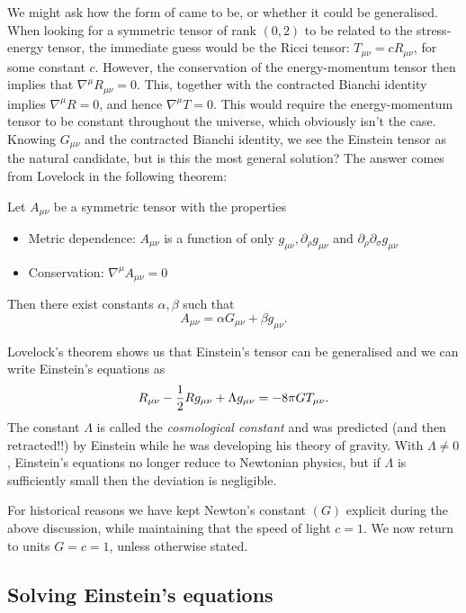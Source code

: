We might ask how the form of  came to be, or whether it could be generalised. When looking for a symmetric tensor of rank $(0,2)$ to be related to the stress-energy tensor, the immediate guess would be the Ricci tensor: $T_{\mu \nu} = c R_{\mu \nu}$, for some constant $c$. However, the conservation of the energy-momentum tensor then implies that $\nabla^\mu R_{\mu \nu} = 0$. This, together with the contracted Bianchi identity implies $\nabla^\mu R = 0$, and hence $\nabla^\mu T = 0$. This would require the energy-momentum tensor to be constant throughout the universe, which obviously isn't the case. Knowing $G_{\mu \nu}$ and the contracted Bianchi identity, we see the Einstein tensor as the natural candidate, but is this the most general solution? The answer comes from Lovelock \cite{Lovelock:1972vz} in the following theorem:
\begin{thm}[Lovelock]
	Let $A_{\mu \nu}$ be a symmetric tensor with the properties
	\begin{itemize}
		\item Metric dependence: $A_{\mu \nu}$ is a function of only $g_{\mu \nu}, \partial_\rho g_{\mu \nu}$ and $\partial_\rho \partial_\sigma g_{\mu \nu}$
		\item Conservation: $\nabla^\mu A_{\mu \nu} = 0$
	\end{itemize}
	Then there exist constants $\alpha, \beta$ such that
	\begin{equation*}
		A_{\mu \nu} = \alpha G_{\mu \nu} + \beta g_{\mu \nu}.
	\end{equation*}
\end{thm}
Lovelock's theorem shows us that Einstein's tensor can be generalised and we can write Einstein's equations as
\begin{equation}
\label{eq:einsteinc}
	R_{\mu \nu} - \frac{1}{2} R g_{\mu \nu} + \Lambda g_{\mu \nu} = - 8 \pi G T_{\mu \nu}.
\end{equation}
The constant $\Lambda$ is called the \emph{cosmological constant} and was predicted (and then retracted!!) by Einstein while he was developing his theory of gravity. With $\Lambda \neq 0$, Einstein's equations no longer reduce to Newtonian physics, but if $\Lambda$ is sufficiently small then the deviation is negligible. 

For historical reasons we have kept Newton's constant $(G)$ explicit during the above discussion, while maintaining that the speed of light $c = 1$. We now return to units $G = c = 1$, unless otherwise stated.

\subsection{Solving Einstein's equations}
\label{sec:solvingeinsteinsequations}

